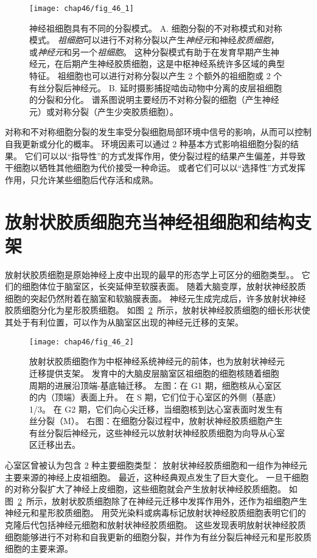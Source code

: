 \begin{figure}[htbp]
	\centering
	\texttt{[image: chap46/fig\_46\_1]}
	\caption{神经祖细胞具有不同的分裂模式。
		A. 细胞分裂的不对称模式和对称模式。
		\textit{祖细胞}可以进行不对称分裂以产生\textit{神经元}和神经\textit{胶质细胞}，或\textit{神经元}和另一个\textit{祖细胞}。
		这种分裂模式有助于在发育早期产生神经元，在后期产生神经胶质细胞，这是中枢神经系统许多区域的典型特征。
		祖细胞也可以进行对称分裂以产生 2 个额外的祖细胞或 2 个有丝分裂后神经元。
		B. 延时摄影捕捉啮齿动物中分离的皮层祖细胞的分裂和分化。
		谱系图说明主要经历不对称分裂的细胞（产生神经元）或对称分裂（产生少突胶质细胞）\cite{qian1998intrinsic}。}
	\label{fig:46_1}
\end{figure}


对称和不对称细胞分裂的发生率受分裂细胞局部环境中信号的影响，从而可以控制自我更新或分化的概率。
环境因素可以通过 2 种基本方式影响祖细胞分裂的结果。
它们可以以“指导性”的方式发挥作用，使分裂过程的结果产生偏差，并导致干细胞以牺牲其他细胞为代价接受一种命运。
或者它们可以以“选择性”方式发挥作用，只允许某些细胞后代存活和成熟。



\section{放射状胶质细胞充当神经祖细胞和结构支架}

放射状胶质细胞是原始神经上皮中出现的最早的形态学上可区分的细胞类型。。
它们的细胞体位于脑室区，长突延伸至软膜表面。
随着大脑变厚，放射状神经胶质细胞的突起仍然附着在脑室和软脑膜表面。
神经元生成完成后，许多放射状神经胶质细胞分化为星形胶质细胞。
如图~\ref{fig:46_2}~所示，放射状神经胶质细胞的细长形状使其处于有利位置，可以作为从脑室区出现的神经元迁移的支架。


\begin{figure}[htbp]
	\centering
	\texttt{[image: chap46/fig\_46\_2]}
	\caption{放射状胶质细胞作为中枢神经系统神经元的前体，也为放射状神经元迁移提供支架。
		发育中的大脑皮层脑室区祖细胞的细胞核随着细胞周期的进展沿顶端-基底轴迁移。
		左图：在 G1 期，细胞核从心室区的内（顶端）表面上升。
		在 S 期，它们位于心室区的外侧（基底）1/3。
		在 G2 期，它们向心尖迁移，当细胞核到达心室表面时发生有丝分裂（M）。
		右图：在细胞分裂过程中，放射状神经胶质细胞产生有丝分裂后神经元，这些神经元以放射状神经胶质细胞为向导从心室区迁移出去。}
	\label{fig:46_2}
\end{figure}


心室区曾被认为包含 2 种主要细胞类型：
放射状神经胶质细胞和一组作为神经元主要来源的神经上皮祖细胞。
最近，这种经典观点发生了巨大变化。
一旦干细胞的对称分裂扩大了神经上皮细胞，这些细胞就会产生放射状神经胶质细胞。
如图~\ref{fig:46_2}~所示，放射状胶质细胞除了在神经元迁移中发挥作用外，还作为祖细胞产生神经元和星形胶质细胞。
用荧光染料或病毒标记放射状神经胶质细胞表明它们的克隆后代包括神经元细胞和放射状神经胶质细胞。
这些发现表明放射状神经胶质细胞能够进行不对称和自我更新的细胞分裂，并作为有丝分裂后神经元和星形胶质细胞的主要来源。



